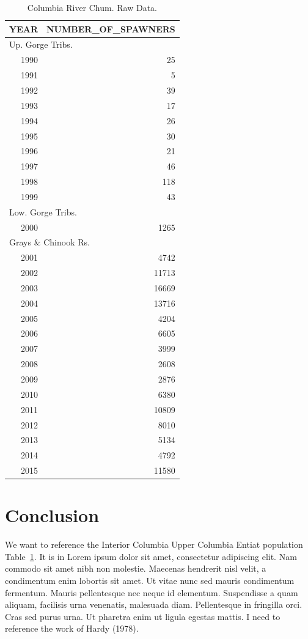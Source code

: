 \documentclass[
  letterpaper,
  oneside,
  open=any]{scrbook}
\begin{document}
\hypertarget{tbl-CRchum-rawdata}{}
\begin{longtable}{rr}
\caption{\label{tbl-CRchum-rawdata}Columbia River Chum. Raw Data. }\tabularnewline

\toprule
YEAR & NUMBER\_OF\_SPAWNERS \\ 
\midrule
\multicolumn{2}{l}{Up. Gorge Tribs.} \\ 
\midrule
1990 & 25 \\ 
1991 & 5 \\ 
1992 & 39 \\ 
1993 & 17 \\ 
1994 & 26 \\ 
1995 & 30 \\ 
1996 & 21 \\ 
1997 & 46 \\ 
1998 & 118 \\ 
1999 & 43 \\ 
\midrule
\multicolumn{2}{l}{Low. Gorge Tribs.} \\ 
\midrule
2000 & 1265 \\ 
\midrule
\multicolumn{2}{l}{Grays \& Chinook Rs.} \\ 
\midrule
2001 & 4742 \\ 
2002 & 11713 \\ 
2003 & 16669 \\ 
2004 & 13716 \\ 
2005 & 4204 \\ 
2006 & 6605 \\ 
2007 & 3999 \\ 
2008 & 2608 \\ 
2009 & 2876 \\ 
2010 & 6380 \\ 
2011 & 10809 \\ 
2012 & 8010 \\ 
2013 & 5134 \\ 
2014 & 4792 \\ 
2015 & 11580 \\ 
\bottomrule
\end{longtable}


\hypertarget{conclusion}{%
\chapter{Conclusion}\label{conclusion}}

We want to reference the Interior Columbia Upper Columbia Entiat
population Table~\ref{tbl-CRchum-rawdata}. It is in Lorem ipsum dolor
sit amet, consectetur adipiscing elit. Nam commodo sit amet nibh non
molestie. Maecenas hendrerit nisl velit, a condimentum enim lobortis sit
amet. Ut vitae nunc sed mauris condimentum fermentum. Mauris
pellentesque nec neque id elementum. Suspendisse a quam aliquam,
facilisis urna venenatis, malesuada diam. Pellentesque in fringilla
orci. Cras sed purus urna. Ut pharetra enim ut ligula egestas mattis. I
need to reference the work of Hardy (1978).
\end{document}
